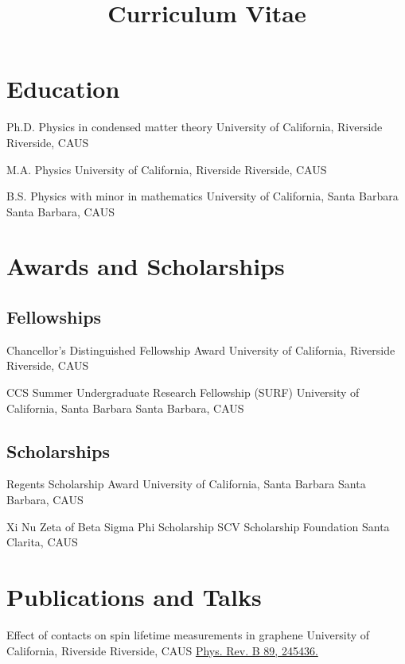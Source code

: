 \documentclass[10pt,letter]{moderncv}
\title{Curriculum Vitae}
\begin{document}
  \maketitle

  \section{Education}

    {Ph.D. Physics in condensed matter theory}
    {University of California, Riverside}
    {Riverside, CA}{US}{}

    {M.A. Physics}
    {University of California, Riverside}
    {Riverside, CA}{US}{}

    {B.S. Physics with minor in mathematics}
    {University of California, Santa Barbara}
    {Santa Barbara, CA}{US}{}

  \section{Awards and Scholarships}

  \subsection{Fellowships}

    {Chancellor's Distinguished Fellowship Award}
    {University of California, Riverside}
    {Riverside, CA}{US}{}

    {CCS Summer Undergraduate Research Fellowship (SURF)}
    {University of California, Santa Barbara}
    {Santa Barbara, CA}{US}{}

  \subsection{Scholarships}

    {Regents Scholarship Award}
    {University of California, Santa Barbara}
    {Santa Barbara, CA}{US}{}

    {Xi Nu Zeta of Beta Sigma Phi Scholarship}
    {SCV Scholarship Foundation}
    {Santa Clarita, CA}{US}{}

  \section{Publications and Talks}

    {Effect of contacts on spin lifetime measurements in graphene}
    {University of California, Riverside}
    {Riverside, CA}{US}
    {\href{https://journals.aps.org/prb/abstract/10.1103/PhysRevB.89.245436}
      {Phys. Rev. B 89, 245436.}}
\end{document}
